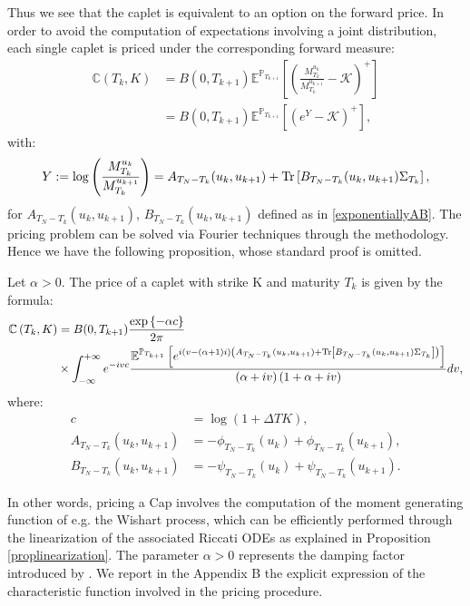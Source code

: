 Thus we see that the caplet is equivalent to an option on the forward price. In order to avoid the computation of expectations involving a joint distribution, each single caplet is priced under the corresponding forward measure:
\begin{align}
\mathbb{C}\left(T_{k},K\right)&=B(0,T_{k+1})\mathbb{E}^{\mathbb{P}_{T_{k+1}}}\left[\left( \frac{M^{u_{k}}_{T_{k}}}{M^{u_{k+1}}_{T_{k}}}-\mathcal{K} \right)^{+} \right]\nonumber\\
&=B(0,T_{k+1})\mathbb{E}^{\mathbb{P}_{T_{k+1}}}\left[\left(e^Y-\mathcal{K} \right)^{+} \right],
\end{align}
with:
\begin{align}
Y:=\log\left(\frac{M^{u_{k}}_{T_{k}}}{M^{u_{k+1}}_{T_{k}}}\right)=A_{T_N-T_k}(u_k,u_{k+1})+\textup{Tr}\left[B_{T_N-T_k}(u_k,u_{k+1})\Sigma_{T_{k}} \right],
\end{align}
for $A_{T_N-T_k}(u_k,u_{k+1})$, $B_{T_N-T_k}(u_k,u_{k+1})$ defined as in \eqref{exponentiallyAB}. The pricing problem can be solved via Fourier techniques through the \cite{article_Carr99} methodology. Hence we have the following proposition, whose standard proof is omitted. %
\begin{proposition}\label{price_caplet}
Let $\alpha>0$. The price of a caplet with strike K and maturity $T_{k}$ is given by the formula:
\begin{align}
\mathbb{C}\left(T_{k},K\right)&=B(0,T_{k+1})\frac{\exp\left\{-\alpha c \right\}}{2\pi}\nonumber\\
&\times\int_{-\infty}^{+\infty}{e^{-ivc} \frac{\mathbb{E}^{\mathbb{P}_{T_{k+1}}}\left[e^{i\left( v-\left(\alpha +1 \right)i\right)\left(A_{T_N-T_k}(u_k,u_{k+1})+\textup{Tr}\left[B_{T_N-T_k}(u_k,u_{k+1})\Sigma_{T_{k}} \right]\right)} \right]}{\left(\alpha +iv\right)\left(1+\alpha +iv\right)}dv},
\end{align}
where:
\begin{align}
c&=\log\left(1+\Delta TK\right),\nonumber\\
A_{T_N-T_k}(u_k,u_{k+1})&=-\phi_{T_{N}-T_{k}}(u_{k})+\phi_{T_{N}-T_{k}}(u_{k+1}),\nonumber\\
B_{T_N-T_k}(u_k,u_{k+1})&=-\psi_{T_{N}-T_{k}}(u_{k})+\psi_{T_{N}-T_{k}}(u_{k+1}).\nonumber
\end{align}
\end{proposition}

In other words, pricing a Cap involves the computation of the moment generating function of e.g. the Wishart process, which can be efficiently performed through the linearization of the associated Riccati ODEs as explained in Proposition \ref{proplinearization}. The parameter $\alpha>0$ represents the damping factor introduced by \cite{article_Carr99}. We report in the Appendix B the explicit expression of the characteristic function involved in the pricing procedure.


